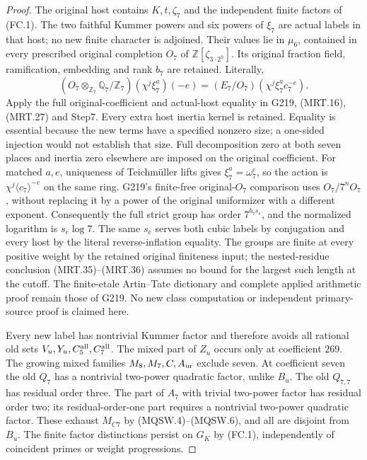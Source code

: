 \begin{proof}
The original host contains $K,t,\zeta_7$ and the independent
finite factors of (FC.1). The two faithful Kummer powers and
six powers of $\xi_7$ are actual labels in that host; no new
finite character is adjoined. Their values lie in $\mu_6$,
contained in every prescribed original completion $O_7$ of
$\mathbb Z[\zeta_{3\cdot2^h}]$. Its original fraction field,
ramification, embedding and rank $b_7$ are retained. Literally,
\[
 (O_7\otimes_{\mathbb Z_7}\mathbb Q_7/\mathbb Z_7)
                         (\chi^j\xi_7^a)(-e)
       =(E_7/O_7)(\chi^j\xi_7^a c_7^{-e}).
 \tag{MRTW.13}
\]
Apply the full original-coefficient and actual-host equality in
G219, (MRT.16), (MRT.27) and Step7. Every extra host inertia
kernel is retained. Equality is essential because the new terms
have a specified nonzero size; a one-sided injection would not
establish that size. Full decomposition zero at both seven places
and inertia zero elsewhere are imposed on the original coefficient.
For matched $a,e$, uniqueness of Teichm\"uller lifts gives
$\xi_7^a=\omega_7^e$, so the action is
$\chi^j\langle c_7\rangle^{-e}$ on the same ring.
G219's finite-free original-$O_7$ comparison uses $O_7/7^nO_7$,
without replacing it by a power of the original uniformizer with
a different exponent. Consequently the full strict group has
order $7^{b_7s_e}$, and the normalized logarithm is $s_e\log7$.
The same $s_e$ serves both cubic labels by conjugation and every
host by the literal reverse-inflation equality. The groups are
finite at every positive weight by the retained original finiteness
input; the nested-residue conclusion (MRT.35)--(MRT.36) assumes no bound for
the largest such length at the cutoff.
The finite-etale Artin--Tate dictionary and complete applied
arithmetic proof remain those of G219. No new class computation
or independent primary-source proof is claimed here.

Every new label has nontrivial Kummer factor and therefore avoids
all rational old sets $V_u,Y_u,C_5^{\rm all},C_7^{\rm all}$.
The mixed part of $Z_u$ occurs only at coefficient $269$.
The growing mixed families $M_8,M_7,C,A_{\rm ur}$ exclude seven.
At coefficient seven the old $Q_7$ has a nontrivial two-power
quadratic factor, unlike $B_u$. The old $Q_{7,7}$ has residual
order three. The part of $A_7$ with trivial two-power factor has
residual order two; its residual-order-one part requires a
nontrivial two-power quadratic factor. These exhaust $M_{C7}$
by (MQSW.4)--(MQSW.6), and all are disjoint from $B_u$.
The finite factor distinctions persist on $G_K$ by (FC.1),
independently of coincident primes or weight progressions.


\end{proof}
